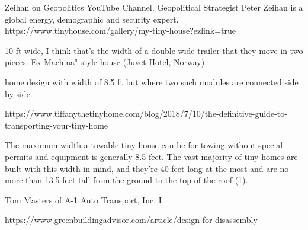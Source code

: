 
Zeihan on Geopolitics YouTube Channel. Geopolitical Strategist Peter Zeihan is a global energy, demographic and security expert.
https://www.tinyhouse.com/gallery/my-tiny-house?ezlink=true

 10 ft wide, I think that's the width of a double wide trailer that they move in two pieces. 
Ex Machina" style house (Juvet Hotel, Norway)


home design with width of 8.5 ft but where two such modules are connected side by side.

https://www.tiffanythetinyhome.com/blog/2018/7/10/the-definitive-guide-to-transporting-your-tiny-home

The maximum width a towable tiny house can be for towing without special permits and equipment is generally 8.5 feet. The vast majority of tiny homes are built with this width in mind, and they’re 40 feet long at the most and are no more than 13.5 feet tall from the ground to the top of the roof (1).

 Tom Masters of A-1 Auto Transport, Inc. I

 https://www.greenbuildingadvisor.com/article/design-for-disassembly
 